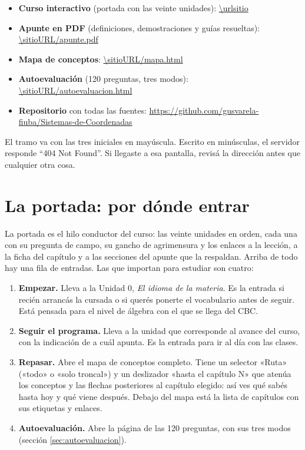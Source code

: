 \documentclass[11pt,a4paper]{report}
\newcommand{\clave}[1]{\texttt{\detokenize{#1}}}
\begin{document}
\begin{resultado}[Direcciones]
\begin{itemize}
  \item \textbf{Curso interactivo} (portada con las veinte unidades): \url{\urlsitio}
  \item \textbf{Apunte en PDF} (definiciones, demostraciones y guías resueltas): \url{\sitioURL/apunte.pdf}
  \item \textbf{Mapa de conceptos}: \url{\sitioURL/mapa.html}
  \item \textbf{Autoevaluación} (120 preguntas, tres modos): \url{\sitioURL/autoevaluacion.html}
  \item \textbf{Repositorio} con todas las fuentes: \url{https://github.com/gusvarela-fiuba/Sistemas-de-Coordenadas}
\end{itemize}
\end{resultado}

\begin{atencion}
El tramo \clave{Sistemas-de-Coordenadas} va con las tres iniciales en mayúscula. Escrito en minúsculas, el servidor responde \enquote{404 Not Found}. Si llegaste a esa pantalla, revisá la dirección antes que cualquier otra cosa.
\end{atencion}

\section{La portada: por dónde entrar}\label{sec:portada}

La portada es el hilo conductor del curso: las veinte unidades en orden, cada una con su pregunta de campo, su gancho de agrimensura y los enlaces a la lección, a la ficha del capítulo y a las secciones del apunte que la respaldan. Arriba de todo hay una fila de entradas. Las que importan para estudiar son cuatro:

\begin{enumerate}
  \item \textbf{Empezar.} Lleva a la Unidad 0, \emph{El idioma de la materia}. Es la entrada si recién arrancás la cursada o si querés ponerte el vocabulario antes de seguir. Está pensada para el nivel de álgebra con el que se llega del CBC.
  \item \textbf{Seguir el programa.} Lleva a la unidad que corresponde al avance del curso, con la indicación de a cuál apunta. Es la entrada para ir al día con las clases.
  \item \textbf{Repasar.} Abre el mapa de conceptos completo. Tiene un selector «Ruta» («todo» o «solo troncal») y un deslizador «hasta el capítulo N» que atenúa los conceptos y las flechas posteriores al capítulo elegido: así ves qué sabés hasta hoy y qué viene después. Debajo del mapa está la lista de capítulos con sus etiquetas y enlaces.
  \item \textbf{Autoevaluación.} Abre la página de las 120 preguntas, con sus tres modos (sección \ref{sec:autoevaluacion}).
\end{enumerate}
\end{document}
